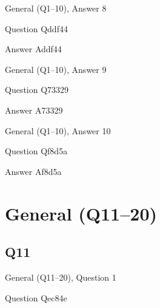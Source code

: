 \documentclass[11pt]{beamer}
\begin{document}
\begin{frame}[t]{General (Q1--10), Answer 8}
\vspace{2em}
\begin{block}{Question}
Qddf44
\end{block}
\pause{}
\begin{block}{Answer}
Addf44
\end{block}
\end{frame}
    

\begin{frame}[t]{General (Q1--10), Answer 9}
\vspace{2em}
\begin{block}{Question}
Q73329
\end{block}
\pause{}
\begin{block}{Answer}
A73329
\end{block}
\end{frame}
    

\begin{frame}[t]{General (Q1--10), Answer 10}
\vspace{2em}
\begin{block}{Question}
Qf8d5a
\end{block}
\pause{}
\begin{block}{Answer}
Af8d5a
\end{block}
\end{frame}
    

\section{General (Q11--20)}
    

\subsection*{Q11}
\begin{frame}[t]{General (Q11--20), Question 1}
\vspace{2em}
\begin{block}{Question}
Qec84e
\end{block}
\begin{center}


\end{center}
\end{frame}
    
\end{document}

